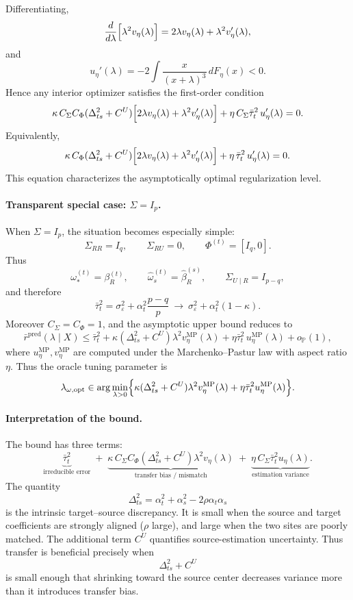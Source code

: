 \documentclass[11pt]{article}
\newcommand{\1}{\mathbf{1}}
\begin{document}
Differentiating,
\[
\frac{d}{d\lambda}\Bigl[\lambda^2 v_\eta(\lambda)\Bigr]
=
2\lambda v_\eta(\lambda)+\lambda^2 v_\eta'(\lambda),
\]
and
\[
u_\eta'(\lambda)
=
-2\int \frac{x}{(x+\lambda)^3}\,dF_\eta(x)<0.
\]
Hence any interior optimizer satisfies the first-order condition
\[
\kappa\,C_\Sigma C_\Phi(\Delta_{ts}^2+C^U)
\Bigl[2\lambda v_\eta(\lambda)+\lambda^2 v_\eta'(\lambda)\Bigr]
+
\eta\,C_\Sigma\bar\tau_t^2\,u_\eta'(\lambda)
=0.
\]
Equivalently,
\[
\kappa\,C_\Phi(\Delta_{ts}^2+C^U)
\Bigl[2\lambda v_\eta(\lambda)+\lambda^2 v_\eta'(\lambda)\Bigr]
+
\eta\,\bar\tau_t^2\,u_\eta'(\lambda)
=0.
\]
This equation characterizes the asymptotically optimal regularization level.

\bigskip

\paragraph{Transparent special case: \(\Sigma=I_p\).}

When \(\Sigma=I_p\), the situation becomes especially simple:
\[
\Sigma_{RR}=I_q,\qquad \Sigma_{RU}=0,\qquad \Phi^{(t)}=[I_q,0].
\]
Thus
\[
\omega_*^{(t)}=\beta_R^{(t)},
\qquad
\hat\omega_s^{(t)}=\hat\beta_R^{(s)},
\qquad
\Sigma_{U\mid R}=I_{p-q},
\]
and therefore
\[
\bar\tau_t^2
=
\sigma_\varepsilon^2+\alpha_t^2\frac{p-q}{p}
\ \longrightarrow\
\sigma_\varepsilon^2+\alpha_t^2(1-\kappa).
\]
Moreover \(C_\Sigma=C_\Phi=1\), and the asymptotic upper bound reduces to
\[
\bar r^{\mathrm{pred}}(\lambda\mid X)
\le
\bar\tau_t^2
+
\kappa(\Delta_{ts}^2+C^U)\lambda^2 v_\eta^{\mathrm{MP}}(\lambda)
+
\eta\bar\tau_t^2\,u_\eta^{\mathrm{MP}}(\lambda)
+
o_{\mathbb P}(1),
\]
where \(u_\eta^{\mathrm{MP}},v_\eta^{\mathrm{MP}}\) are computed under the Marchenko--Pastur law with aspect ratio \(\eta\). Thus the oracle tuning parameter is
\[
\lambda_{\omega,\mathrm{opt}}
\in
\arg\min_{\lambda>0}
\Bigl\{
\kappa(\Delta_{ts}^2+C^U)\lambda^2 v_\eta^{\mathrm{MP}}(\lambda)
+
\eta\bar\tau_t^2 u_\eta^{\mathrm{MP}}(\lambda)
\Bigr\}.
\]

\bigskip

\paragraph{Interpretation of the bound.}

The bound has three terms:
\[
\underbrace{\bar\tau_t^2}_{\text{irreducible error}}
\;+\;
\underbrace{
\kappa\,C_\Sigma C_\Phi(\Delta_{ts}^2+C^U)\lambda^2 v_\eta(\lambda)
}_{\text{transfer bias / mismatch}}
\;+\;
\underbrace{
\eta\,C_\Sigma\bar\tau_t^2 u_\eta(\lambda)
}_{\text{estimation variance}}.
\]
The quantity
\[
\Delta_{ts}^2=\alpha_t^2+\alpha_s^2-2\rho\alpha_t\alpha_s
\]
is the intrinsic target--source discrepancy. It is small when the source and target coefficients are strongly aligned (\(\rho\) large), and large when the two sites are poorly matched. The additional term \(C^U\) quantifies source-estimation uncertainty. Thus transfer is beneficial precisely when
\[
\Delta_{ts}^2+C^U
\]
is small enough that shrinking toward the source center decreases variance more than it introduces transfer bias.
\end{document}
